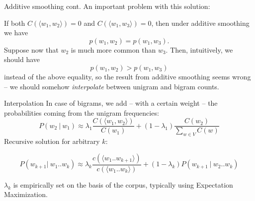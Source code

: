 \documentclass[style=upen, size=14pt]{powerdot}
\theoremstyle{definition}
\begin{document}
\begin{slide}[toc=]{Additive smoothing cont.}
  An important problem with this solution:

  If both $C(\langle w_1,w_2\rangle)=0$ and $C(\langle w_1,w_3\rangle)=0$, then under
  additive smoothing we have 
  $$ p(w_1,w_2)=p(w_1,w_3).$$
  Suppose now that $w_2$ is much more common than $w_3$. Then, intuitively, we
  should have 
  $$ p(w_1,w_2)>p(w_1,w_3)$$
  instead of the above equality, so the result from additive smoothing seems
  wrong -- we should somehow \emph{interpolate} between unigram and bigram
  counts.
\end{slide}

\begin{slide}[toc=Interpolation]{Interpolation}
  In case of bigrams, we add -- with a certain weight -- the probabilities coming
  from the unigram frequencies:
$$P(w_2 ~\vert ~w_1) \approx \lambda_1\frac{C(\langle w_1, w_2 \rangle)}{C(w_1)} + (1 - \lambda_1)\frac{C(w_2)}{\sum_{w\in V}C(w)}$$
Recursive solution for arbitrary $k$:
\begin{small}
$$P(w_{k+1} \vert~ w_1.. w_k) \approx \lambda_k\frac{c(\langle w_1 .. w_{k+1} \rangle)}{c(\langle w_1 .. w_k\rangle)} + (1-\lambda_k)P(w_{k+1} ~\vert~ w_2 .. w_{k})$$
\end{small}
$\lambda_k$ is empirically set on the basis of the corpus, typically using
Expectation Maximization.


\end{slide}
\end{document}
